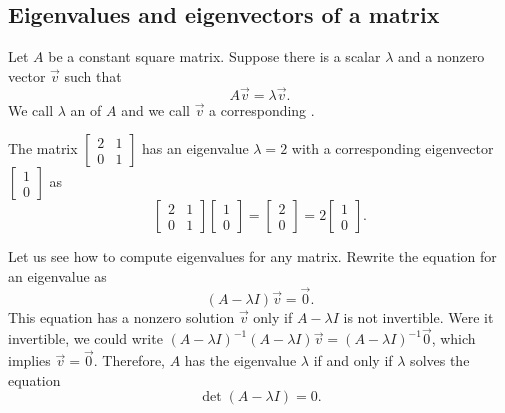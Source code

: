 \documentclass{ximera}
\begin{document}
\subsection{Eigenvalues and eigenvectors of a matrix}

Let $A$ be a constant square matrix.  Suppose there is a scalar $\lambda$ and a nonzero vector $\vec{v}$ such that
\begin{equation*}
    A \vec{v} = \lambda \vec{v}.
\end{equation*}
We call $\lambda$ an \emph{} of $A$ and we call $\vec{v}$ a corresponding \emph{}.

\begin{example}
    The matrix 
    $\left[ 
        \begin{smallmatrix}
            2 & 1 \\
            0 & 1
        \end{smallmatrix} 
    \right]$ 
    has an eigenvalue $\lambda = 2$ with a corresponding eigenvector 
    $\left[ 
        \begin{smallmatrix}
            1 \\ 
            0
        \end{smallmatrix} 
    \right]$ as
    \begin{equation*}
        \begin{bmatrix}
            2 & 1 \\
            0 & 1
        \end{bmatrix}
        \begin{bmatrix}
            1 \\ 
            0
        \end{bmatrix}
        =
        \begin{bmatrix}
            2 \\
            0 
        \end{bmatrix}
        = 2
        \begin{bmatrix}
            1 \\ 
            0
        \end{bmatrix} .
    \end{equation*}
\end{example}

Let us see how to compute eigenvalues for any matrix. Rewrite the equation for an eigenvalue as
\begin{equation*}
    (A - \lambda I)\vec{v} = \vec{0} .
\end{equation*}
This equation has a nonzero solution $\vec{v}$ only if $A - \lambda I$ is not invertible.  Were it invertible, we could write ${(A - \lambda I)}^{-1}(A - \lambda I)\vec{v} = {(A-\lambda I)}^{-1}\vec{0}$, which implies $\vec{v} = \vec{0}$.  Therefore, $A$ has the eigenvalue $\lambda$ if and only if $\lambda$ solves the equation
\begin{equation*}
    \det (A-\lambda I) = 0 .
\end{equation*}
\end{document}
